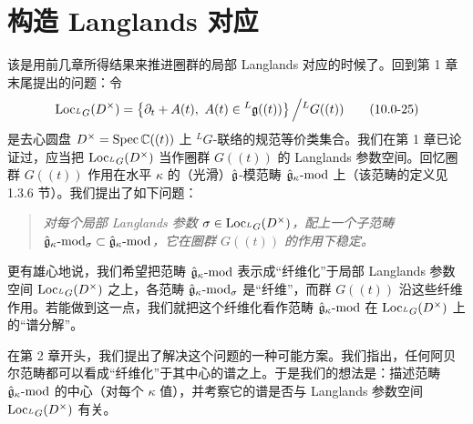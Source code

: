 
\chapter{构造 Langlands 对应}

该是用前几章所得结果来推进圈群的局部 Langlands 对应的时候了。回到第 1 章末尾提出的问题：令
\begin{equation}
    \operatorname{Loc}_{{}^L G}(D^\times)
    =\left\{\partial_t+A(t),\ A(t)\in{}^L\mathfrak{g}((t))\right\}\Big/{}^L G((t))
    \tag{10.0-25}
\end{equation}
是去心圆盘 $D^\times=\operatorname{Spec}\mathbb{C}((t))$ 上 ${}^L G$-联络的规范等价类集合。我们在第 1 章已论证过，应当把 $\operatorname{Loc}_{{}^L G}(D^\times)$ 当作圈群 $G((t))$ 的 Langlands 参数空间。回忆圈群 $G((t))$ 作用在水平 $\kappa$ 的（光滑）$\hat{\mathfrak{g}}$-模范畴 $\hat{\mathfrak{g}}_\kappa\text{-}\mathrm{mod}$ 上（该范畴的定义见 1.3.6 节）。我们提出了如下问题：

\begin{quote}
\itshape
对每个局部 Langlands 参数 $\sigma\in\operatorname{Loc}_{{}^L G}(D^\times)$，配上一个子范畴 $\hat{\mathfrak{g}}_\kappa\text{-}\mathrm{mod}_\sigma\subset\hat{\mathfrak{g}}_\kappa\text{-}\mathrm{mod}$，它在圈群 $G((t))$ 的作用下稳定。
\end{quote}

更有雄心地说，我们希望把范畴 $\hat{\mathfrak{g}}_\kappa\text{-}\mathrm{mod}$ 表示成“纤维化”于局部 Langlands 参数空间 $\operatorname{Loc}_{{}^L G}(D^\times)$ 之上，各范畴 $\hat{\mathfrak{g}}_\kappa\text{-}\mathrm{mod}_\sigma$ 是“纤维”，而群 $G((t))$ 沿这些纤维作用。若能做到这一点，我们就把这个纤维化看作范畴 $\hat{\mathfrak{g}}_\kappa\text{-}\mathrm{mod}$ 在 $\operatorname{Loc}_{{}^L G}(D^\times)$ 上的“谱分解”。

在第 2 章开头，我们提出了解决这个问题的一种可能方案。我们指出，任何阿贝尔范畴都可以看成“纤维化”于其中心的谱之上。于是我们的想法是：描述范畴 $\hat{\mathfrak{g}}_\kappa\text{-}\mathrm{mod}$ 的中心（对每个 $\kappa$ 值），并考察它的谱是否与 Langlands 参数空间 $\operatorname{Loc}_{{}^L G}(D^\times)$ 有关。

